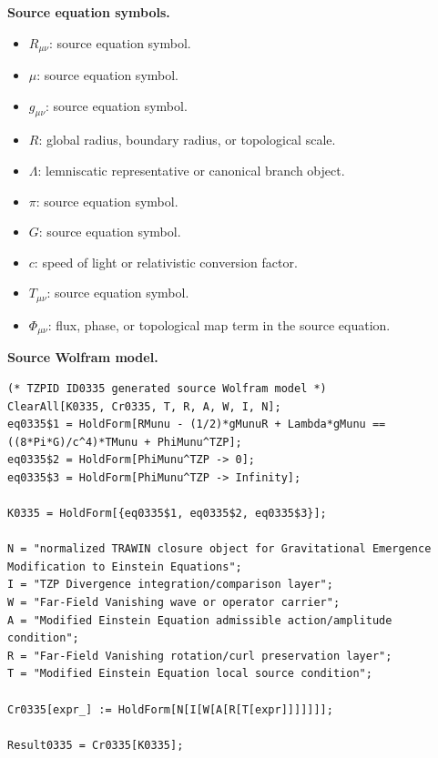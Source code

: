 \begin{minipage}[t]{0.49\linewidth}
\begingroup
\small
\raggedright
\textbf{Source equation symbols.}\par
\begin{itemize}[leftmargin=1.35em,itemsep=1pt,topsep=1pt,parsep=0pt]
    \item $R_{\mu\nu}$: source equation symbol.
    \item $\mu$: source equation symbol.
    \item $g_{\mu\nu}$: source equation symbol.
    \item $R$: global radius, boundary radius, or topological scale.
    \item $\Lambda$: lemniscatic representative or canonical branch object.
    \item $\pi$: source equation symbol.
    \item $G$: source equation symbol.
    \item $c$: speed of light or relativistic conversion factor.
    \item $T_{\mu\nu}$: source equation symbol.
    \item $\Phi_{\mu\nu}$: flux, phase, or topological map term in the source equation.
\end{itemize}
\endgroup
\end{minipage}\hfill
\begin{minipage}[t]{0.47\linewidth}
\begingroup
\scriptsize
\raggedright
\textbf{Source Wolfram model.}\par
\begin{Verbatim}[fontsize=\tiny,breaklines=true,breakanywhere=true]
(* TZPID ID0335 generated source Wolfram model *)
ClearAll[K0335, Cr0335, T, R, A, W, I, N];
eq0335$1 = HoldForm[RMunu - (1/2)*gMunuR + Lambda*gMunu == ((8*Pi*G)/c^4)*TMunu + PhiMunu^TZP];
eq0335$2 = HoldForm[PhiMunu^TZP -> 0];
eq0335$3 = HoldForm[PhiMunu^TZP -> Infinity];

K0335 = HoldForm[{eq0335$1, eq0335$2, eq0335$3}];

N = "normalized TRAWIN closure object for Gravitational Emergence Modification to Einstein Equations";
I = "TZP Divergence integration/comparison layer";
W = "Far-Field Vanishing wave or operator carrier";
A = "Modified Einstein Equation admissible action/amplitude condition";
R = "Far-Field Vanishing rotation/curl preservation layer";
T = "Modified Einstein Equation local source condition";

Cr0335[expr_] := HoldForm[N[I[W[A[R[T[expr]]]]]]];

Result0335 = Cr0335[K0335];
\end{Verbatim}
\endgroup
\end{minipage}

